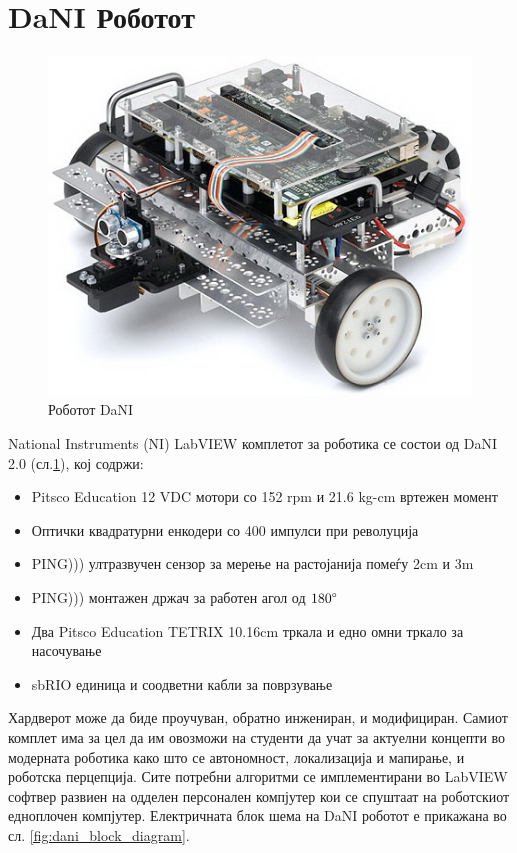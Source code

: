 \documentclass[11pt]{article}
\begin{document}
\newpage
\section{DaNI Роботот}
  \begin{figure}[H]
    \includegraphics[width=0.6\linewidth, keepaspectratio]{./images/dani_isometric.jpg}
    \centering
    \caption{Роботот DaNI}
    \label{fig:dani_isometric}
    \end{figure}

	National Instruments (NI) LabVIEW комплетот за роботика се состои од DaNI 2.0 (сл.\ref{fig:dani_isometric}), кој содржи:

	\begin{itemize}
		\item Pitsco Education 12 VDC мотори со 152 rpm и 21.6 kg-cm вртежен момент
		\item Оптички квадратурни енкодери со 400 импулси при револуција
		\item PING))) ултразвучен сензор за мерење на растојанија помеѓу 2cm и 3m
		\item PING))) монтажен држач за работен агол од $180 \degree$
		\item Два Pitsco Education TETRIX 10.16cm тркала и едно омни тркало за насочување
		\item sbRIO единица и соодветни кабли за поврзување
		\end{itemize}

	Хардверот може да биде проучуван, обратно инжениран, и модифициран. Самиот комплет има за цел да им овозможи на студенти да учат за актуелни концепти во модерната роботика како што се автономност, локализација и мапирање, и роботска перцепција. Сите потребни алгоритми се имплементирани во LabVIEW софтвер развиен на одделен персонален компјутер кои се спуштаат на роботскиот едноплочен компјутер. Електричната блок шема на DaNI роботот е прикажана во сл. \ref{fig:dani_block_diagram}.
\end{document}
